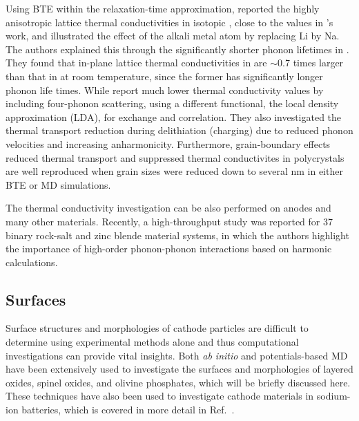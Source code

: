 \documentclass[../main.tex]{subfiles}
\begin{document}
Using BTE within the relaxation-time approximation, \citeauthor{mattila2020lattice} reported the highly anisotropic lattice thermal conductivities in isotopic , close to the values in \citeauthor{yang2019highly}'s work\cite{yang2019highly,yang2020chemical}, and illustrated the effect of the alkali metal atom by replacing Li by Na.\cite{mattila2020lattice} The authors explained this through the significantly shorter phonon lifetimes in . They found that in-plane lattice thermal conductivities in  are $\sim$0.7 times larger than that in  at room temperature, since the former has significantly longer phonon life times. While \citeauthor{feng2020quantum} report much lower thermal conductivity values by including four-phonon scattering, using a different functional, the local density approximation (LDA), for exchange and correlation.\cite{feng2020quantum} They also investigated the thermal transport reduction during delithiation (charging) due to reduced phonon velocities and increasing anharmonicity. Furthermore, grain-boundary effects reduced thermal transport and suppressed thermal conductivites in polycrystals are well reproduced when grain sizes were reduced down to several nm in either BTE or MD simulations. \cite{he2019thermal}

The thermal conductivity investigation can be also performed on anodes and many other materials.\cite{qian2016anisotropic, wei2018tunable} Recently, a high-throughput study was reported for 37 binary rock-salt and zinc blende material systems, in which the authors highlight the importance of high-order phonon-phonon interactions based on harmonic calculations.\cite{xia2020high}

\subsection{Surfaces}
Surface structures and morphologies of cathode particles are difficult to determine using experimental methods alone and thus computational investigations can provide vital insights.\cite{zhang2013nanomaterials} Both \textit{ab initio} and potentials-based MD have been extensively used to investigate the surfaces and morphologies of layered oxides, spinel oxides, and olivine phosphates, which will be briefly discussed here. These techniques have also been used to investigate cathode materials in sodium-ion batteries, which is covered in more detail in Ref.~.
\end{document}
